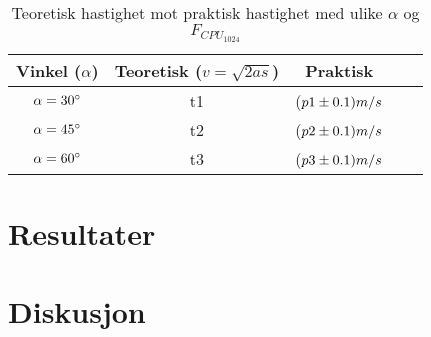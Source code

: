 \documentclass[11pt, a4paper]{article}
\begin{document}
\begin{table}[h]
\caption{Teoretisk hastighet mot praktisk hastighet med ulike $\alpha$ og $F_{CPU_{1024}}$}
\begin{center}
\begin{tabular}{ccccc}
\hline
Vinkel ($\alpha$)  & Teoretisk ($ v =\sqrt{2as}$) &  Praktisk\\
\hline

$\alpha = 30^{\circ}\rm$ & t1 & ($p1 \pm 0.1) m/s \rm$\\

$\alpha = 45^{\circ}\rm$ & t2 & ($p2 \pm 0.1) m/s \rm $ \\

$\alpha = 60^{\circ}\rm$ & t3 & ($p3 \pm 0.1) m/s \rm $ \\

\hline
\end{tabular}
\end{center}
\end{table}



\section{Resultater}
\section{Diskusjon}
\end{document}
